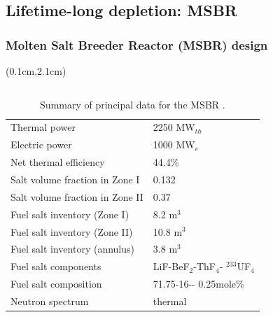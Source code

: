 \subsection{Lifetime-long depletion: MSBR}

\begin{frame}
\frametitle{Molten Salt Breeder Reactor (MSBR) design}

\begin{textblock*}{12.5cm}(0.1cm,2.1cm) %
	
	\begin{columns}
		\column[t]{6cm}
		\begin{table}[h!]
			\fontsize{7}{9}\selectfont
			\caption{Summary of principal data for the \gls{MSBR} 
				\cite{robertson_conceptual_1971}. }
			\vspace{-2mm}
			\begin{tabularx}{\textwidth}{ p{3.6cm}  X}
				\hline
				Thermal power				           		& 2250 MW$_{th}$\\ 
				Electric power		                		& 1000 MW$_e$   
				\\  
				Net thermal efficiency        			    & 44.4\%       	
				\\  
				Salt volume fraction in Zone I				& 0.132			\\ 
				Salt volume fraction in Zone II  			& 0.37			\\ 
				Fuel salt inventory (Zone I)				& 8.2 m$^3$     \\
				Fuel salt inventory (Zone II)				& 10.8 m$^3$    \\
				Fuel salt inventory (annulus)				& 3.8 m$^3$     \\
				Fuel salt components    & LiF-BeF$_2$-ThF$_4$-\newline
				$^{233}$UF$_4$\\  
				Fuel salt composition           & 71.75-16-\newline 12-	
				0.25mole\%	\\  
				Neutron spectrum						    & thermal \\
				\hline
			\end{tabularx}
		\end{table}
		

\end{columns}
\end{textblock*}
\end{frame}

